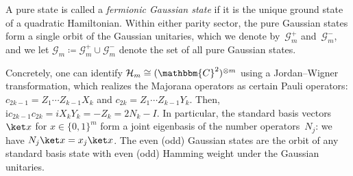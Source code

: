 \documentclass[11pt,a4paper]{article}
\numberwithin{equation}{section}
\newcommand{\ot}{\otimes}
\newcommand{\CC}{\mathbbm{C}}
\newcommand{\HH}{\mathcal{H}}
\newcommand{\GG}{\mathcal G}
\newcommand{\1}{\mathbf{1}}
\DeclareMathOperator{\tr}{tr}
\DeclareMathOperator{\SU}{SU}
\begin{document}
A pure state is called a \emph{fermionic Gaussian state} if it is the unique ground state of a quadratic Hamiltonian.
Within either parity sector, the pure Gaussian states form a single orbit of the Gaussian unitaries, which we denote by~$\GG_m^+$ and~$\GG_m^-$, and we let $\GG_m\coloneqq\GG_m^+\cup\GG_m^-$ denote the set of all pure Gaussian states.

Concretely, one can identify $\HH_m \cong (\CC^2)^{\ot m}$ using a Jordan--Wigner transformation, which realizes the Majorana operators as certain Pauli operators:
$c_{2k-1} = Z_1 \cdots Z_{k-1} X_k$ and $c_{2k} = Z_1 \cdots Z_{k-1} Y_k$.
Then, $\mathrm{i} c_{2k-1} c_{2k} = i X_k Y_k = -Z_k = 2 N_k - I$.
In particular, the standard basis vectors~$\ket x$ for $x \in \{0,1\}^m$ form a joint eigenbasis of the number operators~$N_j$: we have $N_j \ket x = x_j \ket x$.
The even (odd) Gaussian states are the orbit of any standard basis state with even (odd) Hamming weight under the Gaussian unitaries.



\end{document}
